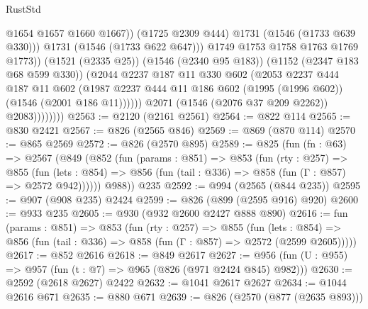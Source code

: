 \begin{lexlean}{RustStd}
\begin{coremodule}
                                  @1654
                                  @1657
                                  @1660
                                  @1667))
                              (@1725 @2309 @444)
                              @1731
                              (@1546 (@1733 @639 @330)))
                            @1731
                            (@1546 (@1733 @622 @647)))
                          @1749
                          @1753
                          @1758
                          @1763
                          @1769
                          @1773))
                      (@1521 (@2335 @25))
                      (@1546 (@2340 @95 @183))
                      (@1152 (@2347 @183 @68 @599 @330))
                      (@2044
                        @2237
                        @187
                        @11
                        @330
                        @602
                        (@2053
                          @2237
                          @444
                          @187
                          @11
                          @602
                          (@1987
                            @2237
                            @444
                            @11
                            @186
                            @602
                            (@1995 (@1996 @602))
                            (@1546 (@2001 @186 @11))))))
                    @2071
                    (@1546 (@2076 @37 @209 @2262))
                    @2083))))))))
@2563 := @2120 (@2161 @2561)
@2564 := @822 @114
@2565 := @830 @2421
@2567 := @826 (@2565 @846)
@2569 := @869 (@870 @114)
@2570 := @865 @2569
@2572 := @826 (@2570 @895)
@2589 := @825
    (fun (fn : @63) =>
    @2567
      (@849
        (@852
          (fun (params : @851) =>
          @853
            (fun (rty : @257) =>
            @855
              (fun (lets : @854) =>
              @856 (fun (tail : @336) => @858 (fun (Γ : @857) => @2572 @942))))))
        @988))
    @235
@2592 := @994 (@2565 (@844 @235))
@2595 := @907 (@908 @235) @2424
@2599 := @826 (@899 (@2595 @916) @920)
@2600 := @933 @235
@2605 := @930 (@932 @2600 @2427 @888 @890)
@2616 := fun (params : @851) =>
  @853
    (fun (rty : @257) =>
    @855
      (fun (lets : @854) =>
      @856 (fun (tail : @336) => @858 (fun (Γ : @857) => @2572 (@2599 @2605)))))
@2617 := @852 @2616
@2618 := @849 @2617
@2627 := @956 (fun (U : @955) => @957 (fun (t : @7) => @965 (@826 (@971 @2424 @845) @982)))
@2630 := @2592 (@2618 @2627) @2422
@2632 := @1041 @2617 @2627
@2634 := @1044 @2616 @671
@2635 := @880 @671
@2639 := @826 (@2570 (@877 (@2635 @893)))

\end{coremodule}
\end{lexlean}

